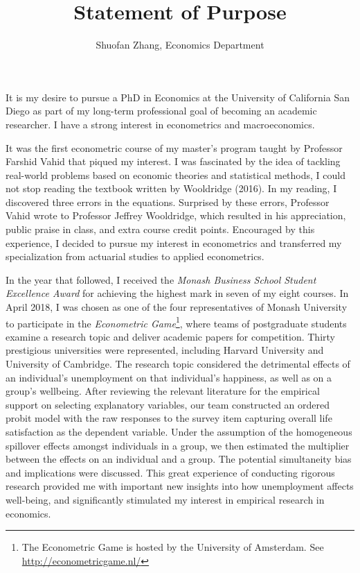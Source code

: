 \documentclass[12pt,]{article}
\title{Statement of Purpose}
\author{Shuofan Zhang, Economics Department}
\date{}
\let\rmarkdownfootnote\footnote%
\def\footnote{\protect\rmarkdownfootnote}
\begin{document}
\maketitle


It is my desire to pursue a PhD in Economics at the University of
California San Diego as part of my long-term professional goal of
becoming an academic researcher. I have a strong interest in
econometrics and macroeconomics.

It was the first econometric course of my master's program taught by
Professor Farshid Vahid that piqued my interest. I was fascinated by the
idea of tackling real-world problems based on economic theories and
statistical methods, I could not stop reading the textbook written by
Wooldridge (2016). In my reading, I discovered three errors in the
equations. Surprised by these errors, Professor Vahid wrote to Professor
Jeffrey Wooldridge, which resulted in his appreciation, public praise in
class, and extra course credit points. Encouraged by this experience, I
decided to pursue my interest in econometrics and transferred my
specialization from actuarial studies to applied econometrics.

In the year that followed, I received the \emph{Monash Business School
Student Excellence Award} for achieving the highest mark in seven of my
eight courses. In April 2018, I was chosen as one of the four
representatives of Monash University to participate in the
\emph{Econometric Game}\footnote{The Econometric Game is hosted by the
  University of Amsterdam. See \url{http://econometricgame.nl/}}, where
teams of postgraduate students examine a research topic and deliver
academic papers for competition. Thirty prestigious universities were
represented, including Harvard University and University of Cambridge.
The research topic considered the detrimental effects of an individual's
unemployment on that individual's happiness, as well as on a group's
wellbeing. After reviewing the relevant literature for the empirical
support on selecting explanatory variables, our team constructed an
ordered probit model with the raw responses to the survey item capturing
overall life satisfaction as the dependent variable. Under the
assumption of the homogeneous spillover effects amongst individuals in a
group, we then estimated the multiplier between the effects on an
individual and a group. The potential simultaneity bias and implications
were discussed. This great experience of conducting rigorous research
provided me with important new insights into how unemployment affects
well-being, and significantly stimulated my interest in empirical
research in economics.
\end{document}
